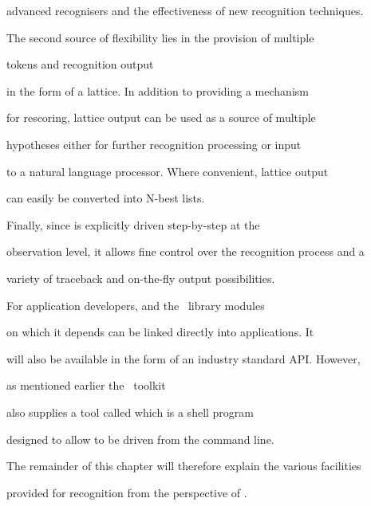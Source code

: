 {\begin{enumerate}
advanced recognisers and the effectiveness of new recognition techniques.







\end{enumerate}





The second source of flexibility lies in the provision of multiple


tokens and recognition output


in the form of a lattice.  In addition to providing a mechanism


for rescoring, lattice output can be used as a source of multiple


hypotheses either for further recognition processing or input


to a natural language processor.  Where convenient, lattice output


can easily be converted into N-best lists.


}





Finally, since  is explicitly driven step-by-step at the


observation level, it allows fine control over the recognition process and a


variety of traceback and on-the-fly output possibilities.





For application developers,  and the \HTK\ library modules


on which it depends can be linked directly into applications.  It 


will also be available in the form of an industry standard API.  However, 


as mentioned earlier the \HTK\ toolkit 


also supplies a tool called  which is a shell program


designed to allow   to be driven from the command line.


The remainder of this chapter will therefore explain the various facilities


provided for recognition from the perspective of .





